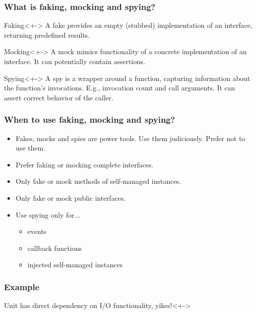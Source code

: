 \begin{frame}
	\frametitle{What is faking, mocking and spying?}

	\begin{block}{Faking}<+->
		A fake provides an empty (stubbed) implementation of an interface, returning predefined results.
	\end{block}

	\begin{block}{Mocking}<+->
		A mock mimics functionality of a concrete implementation of an interface. It can potentially contain assertions.
	\end{block}

	\begin{block}{Spying}<+->
		A spy is a wrapper around a function, capturing information about the function's invocations. E.g., invocation count and call arguments. It can assert correct behavior of the caller.
	\end{block}
\end{frame}


\begin{frame}
	\frametitle{When to use faking, mocking and spying?}

	\begin{itemize}[<+-| highlight@+>]
		\item Fakes, mocks and spies are power tools. Use them judiciously. Prefer not to use them.
		\item Prefer faking or mocking complete interfaces.
		\item Only fake or mock methods of self-managed instances.
		\item Only fake or mock public interfaces.
		\item Use spying only for...
		\begin{itemize}[<+-| highlight@+>]
			\item events
			\item callback functions
			\item injected self-managed instances
		\end{itemize}
	\end{itemize}
\end{frame}


\begin{frame}
	\frametitle{Example}
	\begin{block}{Unit has direct dependency on I/O functionality, yikes!}<+->
		
	\end{block}
\end{frame}


